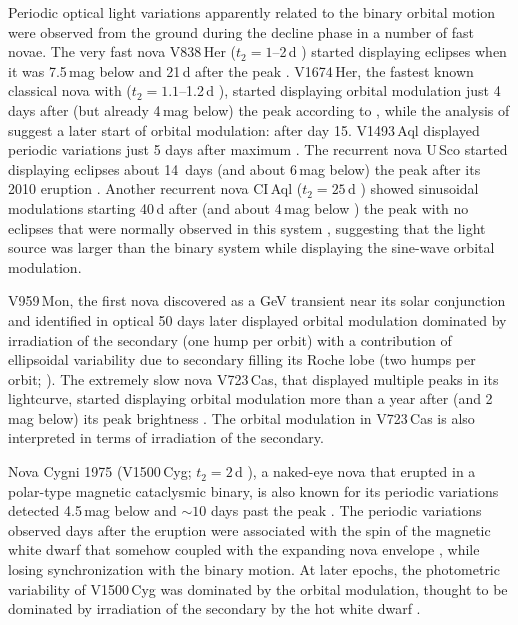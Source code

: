 \documentclass[twocolumn]{aastex631}
\begin{document}
Periodic optical light variations apparently related to the binary orbital motion were observed
from the ground during the decline phase in a number of fast novae.
The very fast nova V838\,Her ($t_2=1$--2\,d \citealt{1996MNRAS.282..563V,2010AJ....140...34S}) 
started displaying eclipses when it was 7.5\,mag below and 21\,d after the peak \citep{2023arXiv230501197K}.
V1674\,Her, the fastest known classical nova with ($t_2=1.1$--1.2\,d
\citealt{2021RNAAS...5..160Q,2021PZ.....41....4S}), 
started displaying orbital modulation just 4 days after (but already 4\,mag below) the peak
according to \cite{2022ApJ...940L..56P}, while the analysis of \cite{2023arXiv231002220L}
suggest a later start of orbital modulation: after day 15.  
%
V1493\,Aql \citep[$t_2=9$\,d;][]{2010AJ....140...34S} displayed periodic
variations just 5 days after maximum \citep{2011A&A...536A..97F}.
%
The recurrent nova U\,Sco \citep[$t_2=1.2$--1.8\,d;][]{2010ApJS..187..275S,2010IBVS.5930....1M} 
started displaying eclipses about 14~days (and about 6\,mag below) the peak after its 2010 eruption
\citep{2010ATel.2452....1S,2015ApJ...811...32P}.
Another recurrent nova CI\,Aql ($t_2=25$\,d \citealt{2010AJ....140...34S}) showed sinusoidal modulations 
starting 40\,d after (and about 4\,mag below \citealt{2010ApJS..187..275S}) 
the peak \citep{2011ApJ...742..112S} with no eclipses that were normally observed in
this system \citep{1995IBVS.4232....1M}, suggesting that the light source 
was larger than the binary system while displaying the sine-wave orbital modulation. 

V959\,Mon, the first nova discovered as a GeV transient near its solar
conjunction and identified in optical 50 days later displayed orbital
modulation dominated by irradiation of the secondary (one hump per orbit) 
with a contribution of ellipsoidal variability due to secondary filling its Roche lobe
(two humps per orbit; \citealt{2013MNRAS.435..771M}). 
The extremely slow nova V723\,Cas, that displayed multiple peaks in its
lightcurve, started displaying orbital modulation more than a year after 
(and 2\,mag below) its peak brightness \citep{2000IBVS.4852....1G,2015MNRAS.454..123O}. 
The orbital modulation in V723\,Cas is also interpreted in terms of
irradiation of the secondary. 

Nova Cygni 1975 (V1500\,Cyg; $t_2=2$\,d \citealt{1988ApJS...66..151L,2010AJ....140...34S}), 
a naked-eye nova that erupted in a polar-type magnetic cataclysmic binary, is also known for its periodic variations
detected 4.5\,mag below and $\sim10$ days past the peak \citep{1975IBVS.1052....1T}. 
The periodic variations observed days after the eruption were associated with the spin 
of the magnetic white dwarf that somehow coupled with the expanding nova
envelope \citep{1988ApJ...332..282S,1999A&A...352..563S}, while losing
synchronization with the binary motion. At later epochs, the photometric
variability of V1500\,Cyg was dominated by the orbital modulation, 
thought to be dominated by irradiation of the secondary by the hot white dwarf
\citep[e.g.,][]{1995ApJ...441..414S,2016MNRAS.459.4161H,2018MNRAS.479..341P}.
\end{document}
